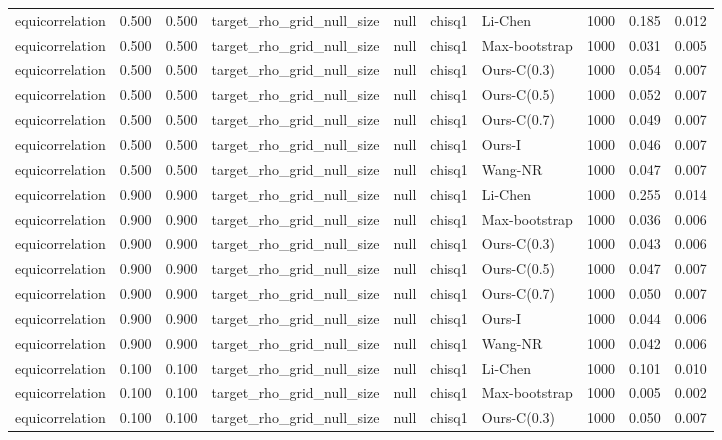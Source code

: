 \begin{tabular}{lrrllllrrr}
equicorrelation & 0.500 & 0.500 & target\_rho\_grid\_null\_size & null & chisq1 & Li-Chen & 1000 & 0.185 & 0.012 \\
equicorrelation & 0.500 & 0.500 & target\_rho\_grid\_null\_size & null & chisq1 & Max-bootstrap & 1000 & 0.031 & 0.005 \\
equicorrelation & 0.500 & 0.500 & target\_rho\_grid\_null\_size & null & chisq1 & Ours-C(0.3) & 1000 & 0.054 & 0.007 \\
equicorrelation & 0.500 & 0.500 & target\_rho\_grid\_null\_size & null & chisq1 & Ours-C(0.5) & 1000 & 0.052 & 0.007 \\
equicorrelation & 0.500 & 0.500 & target\_rho\_grid\_null\_size & null & chisq1 & Ours-C(0.7) & 1000 & 0.049 & 0.007 \\
equicorrelation & 0.500 & 0.500 & target\_rho\_grid\_null\_size & null & chisq1 & Ours-I & 1000 & 0.046 & 0.007 \\
equicorrelation & 0.500 & 0.500 & target\_rho\_grid\_null\_size & null & chisq1 & Wang-NR & 1000 & 0.047 & 0.007 \\
equicorrelation & 0.900 & 0.900 & target\_rho\_grid\_null\_size & null & chisq1 & Li-Chen & 1000 & 0.255 & 0.014 \\
equicorrelation & 0.900 & 0.900 & target\_rho\_grid\_null\_size & null & chisq1 & Max-bootstrap & 1000 & 0.036 & 0.006 \\
equicorrelation & 0.900 & 0.900 & target\_rho\_grid\_null\_size & null & chisq1 & Ours-C(0.3) & 1000 & 0.043 & 0.006 \\
equicorrelation & 0.900 & 0.900 & target\_rho\_grid\_null\_size & null & chisq1 & Ours-C(0.5) & 1000 & 0.047 & 0.007 \\
equicorrelation & 0.900 & 0.900 & target\_rho\_grid\_null\_size & null & chisq1 & Ours-C(0.7) & 1000 & 0.050 & 0.007 \\
equicorrelation & 0.900 & 0.900 & target\_rho\_grid\_null\_size & null & chisq1 & Ours-I & 1000 & 0.044 & 0.006 \\
equicorrelation & 0.900 & 0.900 & target\_rho\_grid\_null\_size & null & chisq1 & Wang-NR & 1000 & 0.042 & 0.006 \\
equicorrelation & 0.100 & 0.100 & target\_rho\_grid\_null\_size & null & chisq1 & Li-Chen & 1000 & 0.101 & 0.010 \\
equicorrelation & 0.100 & 0.100 & target\_rho\_grid\_null\_size & null & chisq1 & Max-bootstrap & 1000 & 0.005 & 0.002 \\
equicorrelation & 0.100 & 0.100 & target\_rho\_grid\_null\_size & null & chisq1 & Ours-C(0.3) & 1000 & 0.050 & 0.007 \\

\end{tabular}
